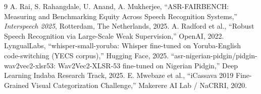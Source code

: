 \documentclass[9pt,twocolumn]{article}
\begin{document}
\begin{thebibliography}{9}
\small
{} A. Rai, S. Rahangdale, U. Anand, A. Mukherjee, ``ASR-FAIRBENCH: Measuring and Benchmarking Equity Across Speech Recognition Systems,'' \textit{Interspeech 2025}, Rotterdam, The Netherlands, 2025.
 A. Radford et al., ``Robust Speech Recognition via Large-Scale Weak Supervision,'' OpenAI, 2022.
 LyngualLabs, ``whisper-small-yoruba: Whisper fine-tuned on Yoruba-English code-switching (YECS corpus),'' Hugging Face, 2025.
 ``asr-nigerian-pidgin/pidgin-wav2vec2-xlsr53: Wav2Vec2-XLSR-53 fine-tuned on Nigerian Pidgin,'' Deep Learning Indaba Research Track, 2025.
 E. Mwebaze et al., ``iCassava 2019 Fine-Grained Visual Categorization Challenge,'' Makerere AI Lab / NaCRRI, 2020.
\end{thebibliography}
\end{document}
